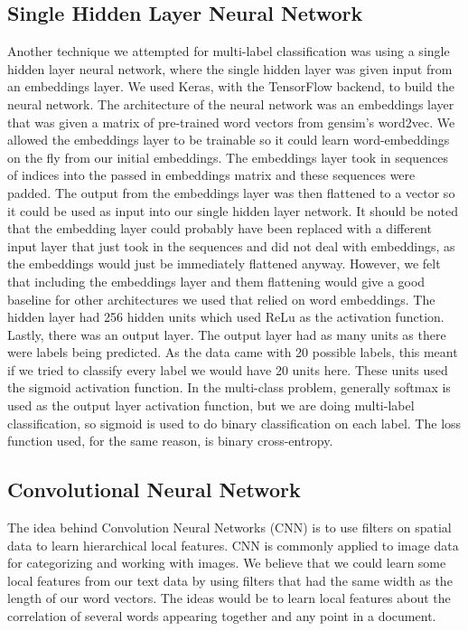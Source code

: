 \documentclass[sigconf]{acmart}
\begin{document}
\subsection{Single Hidden Layer Neural Network}
Another technique we attempted for multi-label classification was using a single hidden layer neural network, where the single hidden layer was given input from an embeddings layer. We used Keras, with the TensorFlow backend, to build the neural network.  The architecture of the neural network was an embeddings layer that was given a matrix of pre-trained word vectors from gensim's word2vec.  We allowed the embeddings layer to be trainable so it could learn word-embeddings on the fly from our initial embeddings. The embeddings layer took in sequences of indices into the passed in embeddings matrix and these sequences were padded. The output from the embeddings layer was then flattened to a vector so it could be used as input into our single hidden layer network. It should be noted that the embedding layer could probably have been replaced with a different input layer that just took in the sequences and did not deal with embeddings, as the embeddings would just be immediately flattened anyway.  However, we felt that including the embeddings layer and them flattening would give a good baseline for other architectures we used that relied on word embeddings.  The hidden layer had 256 hidden units which used ReLu as the activation function.  Lastly, there was an output layer.  The output layer had as many units as there were labels being predicted. As the data came with 20 possible labels, this meant if we tried to classify every label we would have 20 units here.  These units used the sigmoid activation function. In the multi-class problem, generally softmax is used as the output layer activation function, but we are doing multi-label classification, so sigmoid is used to do binary classification on each label.  The loss function used, for the same reason, is binary cross-entropy. 


\subsection{Convolutional Neural Network}
The idea behind Convolution Neural Networks (CNN) is to use filters on spatial data to learn hierarchical local features. CNN is commonly applied to image data for categorizing and working with images. We believe that we could learn some local features from our text data by using filters that had the same width as the length of our word vectors.  The ideas would be to learn local features about the correlation of several words appearing together and any point in a document.
\end{document}
